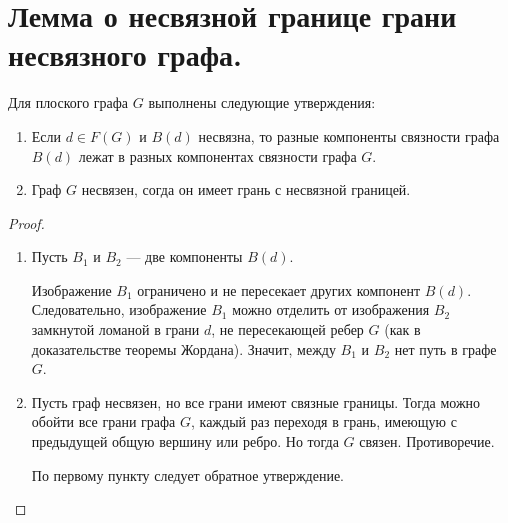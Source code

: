 \section{Лемма о несвязной границе грани несвязного графа.}
\begin{lemma}\label{lm:planar_3}
	Для плоского графа $G$ выполнены следующие утверждения:
    \begin{enumerate}
		\item Если  $d \in F(G) $ и $B(d)$ несвязна, то разные компоненты связности графа $B(d) $ лежат в разных компонентах связности графа $G$.
		\item Граф $G$ несвязен, согда он имеет грань с несвязной границей.
    \end{enumerate}
\end{lemma}
\begin{proof}
	\begin{enumerate}
		\item Пусть $B_1$ и $B_2$ --- две компоненты $B(d)$. 

			Изображение $B_1$ ограничено и не пересекает других компонент $B(d)$. Следовательно, изображение $B_1$ можно отделить от изображения $B_2$ замкнутой ломаной в грани $d$, не пересекающей ребер $G$ (как в доказательстве теоремы Жордана). Значит, между $B_1$ и $B_2$ нет путь в графе $G$.
		\item Пусть граф несвязен, но все грани имеют связные границы. Тогда можно обойти все грани графа $G$, каждый раз переходя в грань, имеющую с предыдущей общую вершину или ребро. Но тогда $G$ связен. Противоречие. 

			По первому пункту следует обратное утверждение.
	\end{enumerate}    
\end{proof}
